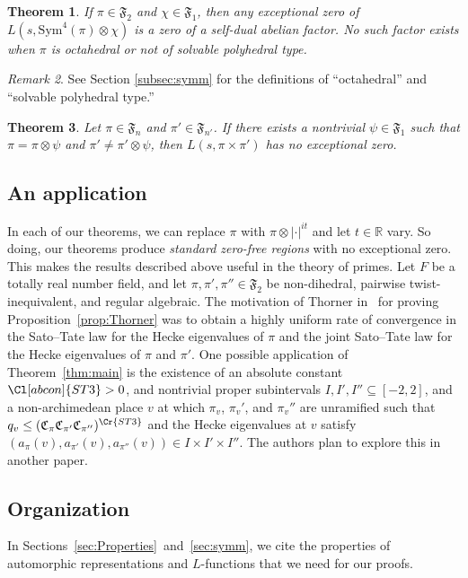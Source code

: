 \documentclass[11pt]{amsart}
\newtheorem{theorem}{Theorem}[section]
\theoremstyle{remark}
\newtheorem{remark}[theorem]{Remark}
\newcommand{\Sym}{\mathrm{Sym}}
\newcommand{\R}{\mathbb{R}}
\numberwithin{equation}{section}
\begin{document}
\begin{theorem}
\label{symmetric fourth no Siegel zero}
If $\pi\in \mathfrak{F}_2$ and $\chi\in \mathfrak{F}_1$, then any exceptional zero of $L(s,\Sym^4(\pi)\otimes\chi)$ is a zero of a self-dual abelian factor.  No such factor exists when $\pi$ is octahedral or not of solvable polyhedral type.
\end{theorem}
\begin{remark}
See Section \ref{subsec:symm} for the definitions of ``octahedral'' and ``solvable polyhedral type.''	
\end{remark}


\begin{theorem}
\label{thm:main3}
Let $\pi\in\mathfrak{F}_n$ and $\pi'\in\mathfrak{F}_{n'}$.  If there exists a nontrivial $\psi\in\mathfrak{F}_1$ such that $\pi=\pi\otimes\psi$ and $\pi'\neq\pi'\otimes\psi$, then $L(s,\pi\times\pi')$ has no exceptional zero.	
\end{theorem}


\subsection*{An application}

In each of our theorems, we can replace $\pi$ with $\pi\otimes|\cdot|^{it}$ and let $t\in\R$ vary.  So doing, our theorems produce {\it standard zero-free regions} with no exceptional zero. This makes the results described above useful in the theory of primes.  Let $F$ be a totally real number field, and let $\pi,\pi',\pi''\in\mathfrak{F}_2$ be non-dihedral, pairwise twist-inequivalent, and regular algebraic.   The motivation of Thorner in~\cite{Thorner_Siegel} for proving Proposition~\ref{prop:Thorner} was to obtain a highly uniform rate of convergence in the Sato--Tate law for the Hecke eigenvalues of $\pi$ and the joint Sato--Tate law for the Hecke eigenvalues of $\pi$ and $\pi'$.  One possible application of Theorem~\ref{thm:main} is the existence of an absolute constant $\Cl[abcon]{ST3}>0$, and nontrivial proper subintervals $I,I',I''\subseteq[-2,2]$, and a non-archimedean place $v$ at which $\pi_v$, $\pi_v'$, and $\pi_v''$ are unramified such that $q_v\leq (\mathfrak{C}_{\pi}\mathfrak{C}_{\pi'}\mathfrak{C}_{\pi''})^{\Cr{ST3}}$ and the Hecke eigenvalues at $v$ satisfy $(a_{\pi}(v),a_{\pi'}(v),a_{\pi''}(v))\in I\times I'\times I''$.  The authors plan to explore this in another paper.


\subsection*{Organization}
In Sections~\ref{sec:Properties}~and~\ref{sec:symm}, we cite the properties of automorphic representations and $L$-functions that we need for our proofs.
\end{document}
